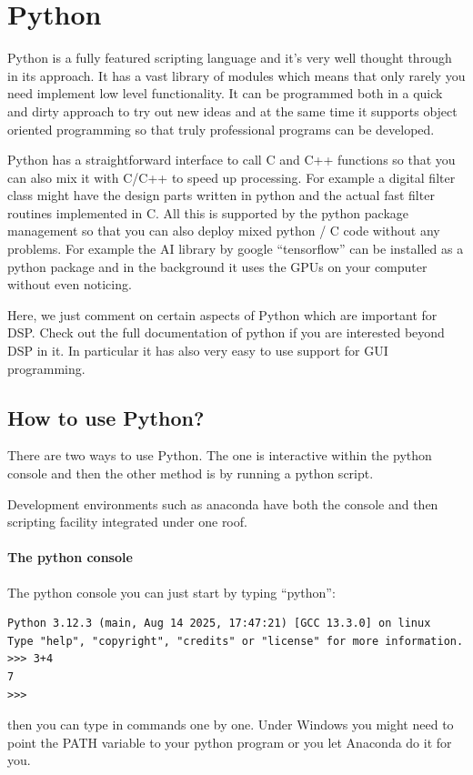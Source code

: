 \documentclass[12pt,a4paper]{article}
\begin{document}
\section{Python}
Python is a fully featured scripting language and it's very well
thought through in its approach. It has a vast library of modules
which means that only rarely you need implement low level
functionality. It can be programmed both in a quick and dirty approach
to try out new ideas and at the same time it supports object oriented
programming so that truly professional programs can be
developed.

Python has a straightforward interface to call C and C++ functions so
that you can also mix it with C/C++ to speed up processing. For
example a digital filter class might have the design parts written in python
and the actual fast filter routines implemented in C. All this is
supported by the python package management so that you can also deploy
mixed python / C code without any problems. For example the AI library by
google ``tensorflow'' can be installed as a python package and in the
background it uses the GPUs on your computer without even noticing.

Here, we just comment on certain aspects of Python which are
important for DSP. Check out the full documentation of python
if you are interested beyond DSP in it. In particular it has
also very easy to use support for GUI programming.

\subsection{How to use Python?}
There are two ways to use Python. The one is interactive within
the python console and then the other method is by running
a python script.

Development environments such as anaconda have both the
console and then scripting facility integrated under one
roof.

\paragraph{The python console}
The python console you can just start by typing
``python'':
\begin{verbatim}
Python 3.12.3 (main, Aug 14 2025, 17:47:21) [GCC 13.3.0] on linux
Type "help", "copyright", "credits" or "license" for more information.
>>> 3+4
7
>>>
\end{verbatim}
then you can type in commands one by one. Under Windows you might
need to point the PATH variable to your python program or you let Anaconda
do it for you.
\end{document}
